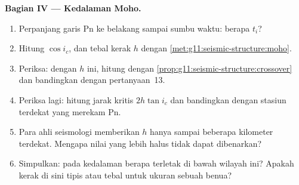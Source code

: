 \begin{problem}
\medskip
\noindent\textbf{Bagian IV --- Kedalaman Moho.}
\begin{enumerate}[resume]
  \item Perpanjang garis Pn ke belakang sampai sumbu waktu: berapa  $t_i$?
  \item Hitung $\cos i_c$, dan tebal kerak $h$ dengan
        \cref{met:g11:seismic-structure:moho}.
  \item Periksa: dengan $h$ ini, hitung  dengan
        \cref{prop:g11:seismic-structure:crossover} dan bandingkan dengan
        pertanyaan~13.
  \item Periksa lagi: hitung jarak kritis $2h\tan i_c$ dan bandingkan
        dengan stasiun terdekat yang merekam Pn.
  \item Para ahli seismologi memberikan $h$ hanya sampai beberapa kilometer
        terdekat. Mengapa nilai yang lebih halus tidak dapat dibenarkan?
  \item Simpulkan: pada kedalaman berapa  terletak di bawah wilayah ini?
        Apakah kerak di sini tipis atau tebal untuk ukuran sebuah benua?
\end{enumerate}
\end{problem}

